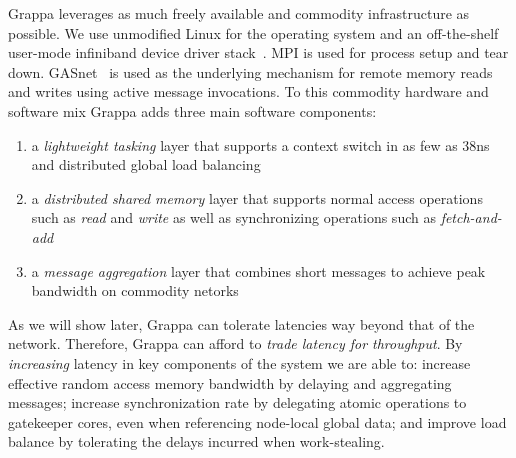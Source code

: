 Grappa leverages as much freely available and commodity infrastructure as
possible. We use unmodified Linux for the operating system and an
off-the-shelf user-mode infiniband device driver stack~\cite{OFED}. MPI is
used for process setup and tear down. GASnet~\cite{gasnet} is used as the
underlying mechanism for remote memory reads and writes using active message
invocations. To this commodity hardware and software mix Grappa adds three
main software components: 
\begin{enumerate}
\item a \emph{lightweight tasking\/} layer that supports
a context switch in as few as 38ns and distributed global load balancing
\item a \emph{distributed shared memory\/} layer that supports normal access operations
such as \emph{read\/} and \emph{write\/} as well as synchronizing operations such as \emph{fetch-and-add\/}~\cite{fetchandadd}
\item a \emph{message aggregation\/} layer that combines short messages to achieve peak bandwidth on commodity netorks
\end{enumerate}
As we will show later, Grappa can tolerate latencies way beyond that of
the network. Therefore, Grappa can afford to \emph{trade latency for
throughput\/}. By {\em increasing\/} latency in key components of the system we
are able to: increase effective random access memory bandwidth by delaying and aggregating messages; increase synchronization rate 
by delegating atomic operations to gatekeeper cores, even when referencing node-local global data; and improve load balance by tolerating the delays incurred when work-stealing.

% 
% 

